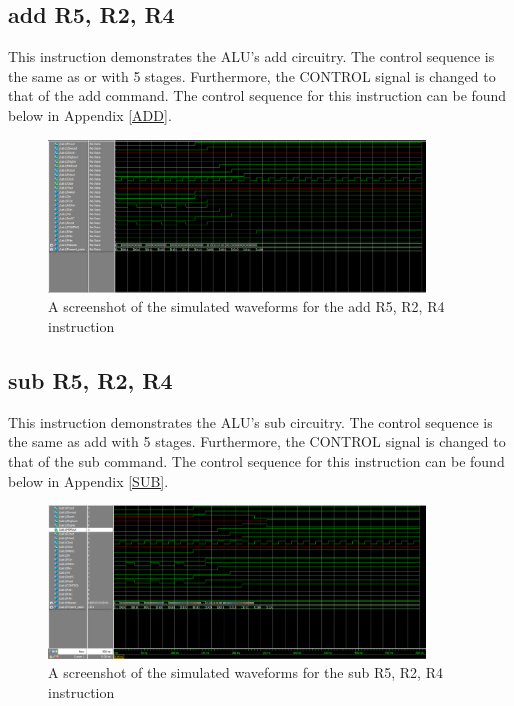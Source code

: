 \documentclass{article}
\begin{document}
    \subsection{add R5, R2, R4}
     This instruction demonstrates the ALU's add circuitry. The control sequence is the same as or with 5 stages. Furthermore, the CONTROL signal is changed to that of the add command. The control sequence for this instruction can be found below in Appendix \ref{ADD}.
     
    \begin{figure}[h!]
        \begin{center}
            \includegraphics[width=10cm]{add}
            \caption{A screenshot of the simulated waveforms for the add R5, R2, R4 instruction}
        \end{center}
    \end{figure}
     
    \subsection{sub R5, R2, R4}
     This instruction demonstrates the ALU's sub circuitry. The control sequence is the same as add with 5 stages. Furthermore, the CONTROL signal is changed to that of the sub command. The control sequence for this instruction can be found below in Appendix \ref{SUB}.
     
    \begin{figure}[h!]
        \begin{center}
            \includegraphics[width=10cm]{sub}
            \caption{A screenshot of the simulated waveforms for the sub R5, R2, R4 instruction}
        \end{center}
    \end{figure}
     
\end{document}
